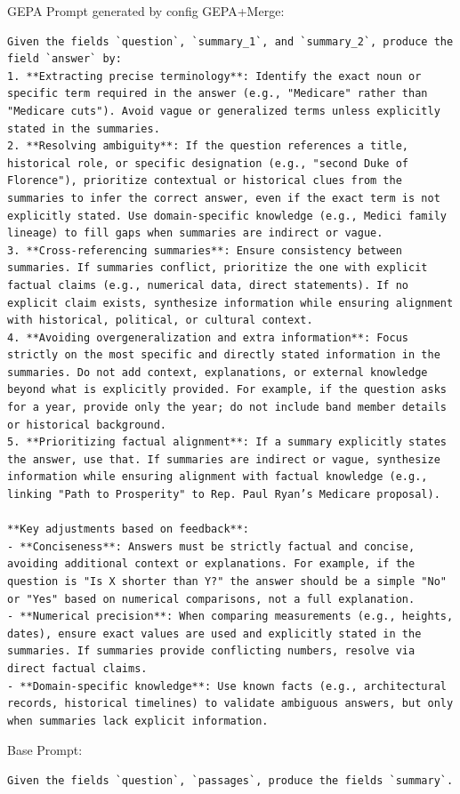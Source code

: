 \begin{instructbox}
GEPA Prompt generated by config GEPA+Merge:
\begin{lstlisting}[breakindent=0pt, breaklines=true, breakatwhitespace=true, frame=single, backgroundcolor=\color{blue!10}]
Given the fields `question`, `summary_1`, and `summary_2`, produce the field `answer` by:  
1. **Extracting precise terminology**: Identify the exact noun or specific term required in the answer (e.g., "Medicare" rather than "Medicare cuts"). Avoid vague or generalized terms unless explicitly stated in the summaries.  
2. **Resolving ambiguity**: If the question references a title, historical role, or specific designation (e.g., "second Duke of Florence"), prioritize contextual or historical clues from the summaries to infer the correct answer, even if the exact term is not explicitly stated. Use domain-specific knowledge (e.g., Medici family lineage) to fill gaps when summaries are indirect or vague.  
3. **Cross-referencing summaries**: Ensure consistency between summaries. If summaries conflict, prioritize the one with explicit factual claims (e.g., numerical data, direct statements). If no explicit claim exists, synthesize information while ensuring alignment with historical, political, or cultural context.  
4. **Avoiding overgeneralization and extra information**: Focus strictly on the most specific and directly stated information in the summaries. Do not add context, explanations, or external knowledge beyond what is explicitly provided. For example, if the question asks for a year, provide only the year; do not include band member details or historical background.  
5. **Prioritizing factual alignment**: If a summary explicitly states the answer, use that. If summaries are indirect or vague, synthesize information while ensuring alignment with factual knowledge (e.g., linking "Path to Prosperity" to Rep. Paul Ryan’s Medicare proposal).  

**Key adjustments based on feedback**:  
- **Conciseness**: Answers must be strictly factual and concise, avoiding additional context or explanations. For example, if the question is "Is X shorter than Y?" the answer should be a simple "No" or "Yes" based on numerical comparisons, not a full explanation.  
- **Numerical precision**: When comparing measurements (e.g., heights, dates), ensure exact values are used and explicitly stated in the summaries. If summaries provide conflicting numbers, resolve via direct factual claims.  
- **Domain-specific knowledge**: Use known facts (e.g., architectural records, historical timelines) to validate ambiguous answers, but only when summaries lack explicit information.
\end{lstlisting}
\end{instructbox}\begin{instructbox}
Base Prompt:
\begin{lstlisting}[breakindent=0pt, breaklines=true, breakatwhitespace=true, frame=single, backgroundcolor=\color{gray!10}]
Given the fields `question`, `passages`, produce the fields `summary`.
\end{lstlisting}


\end{instructbox}
